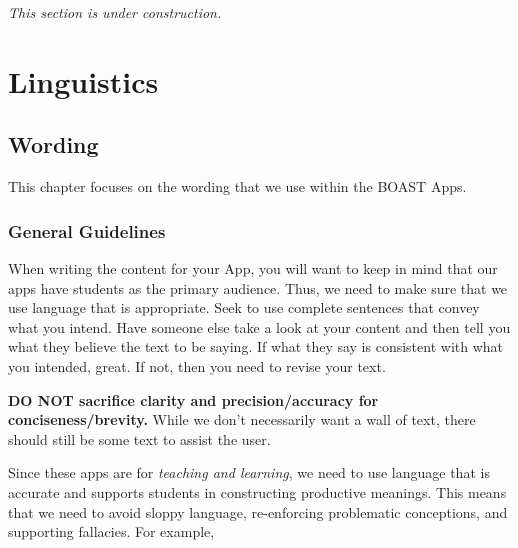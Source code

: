\documentclass[
]{book}
\begin{document}
\emph{This section is under construction.}

\hypertarget{part-linguistics}{%
\part{Linguistics}\label{part-linguistics}}

\hypertarget{wording}{%
\chapter{Wording}\label{wording}}

This chapter focuses on the wording that we use within the BOAST Apps.

\hypertarget{general-guidelines}{%
\section{General Guidelines}\label{general-guidelines}}

When writing the content for your App, you will want to keep in mind that our apps have students as the primary audience. Thus, we need to make sure that we use language that is appropriate. Seek to use complete sentences that convey what you intend. Have someone else take a look at your content and then tell you what they believe the text to be saying. If what they say is consistent with what you intended, great. If not, then you need to revise your text.

\textbf{DO NOT sacrifice clarity and precision/accuracy for
conciseness/brevity.} While we don't necessarily want a wall of text, there should still be some text to assist the user.

Since these apps are for \emph{teaching and learning}, we need to use language that is accurate and supports students in constructing productive meanings. This means that we need to avoid sloppy language, re-enforcing problematic conceptions, and supporting fallacies. For example,
\end{document}
